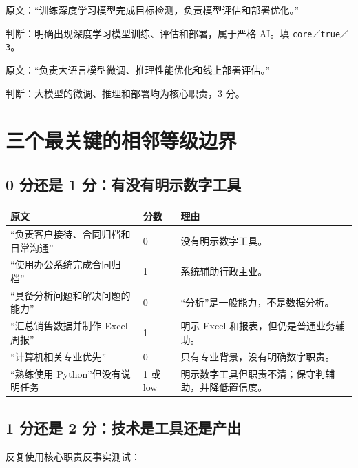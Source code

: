 \documentclass[11pt,a4paper,fontset=none]{ctexart}
\begin{document}
\begin{examplebox}[3 分例 1：计算机视觉]
原文：“训练深度学习模型完成目标检测，负责模型评估和部署优化。”

判断：明确出现深度学习模型训练、评估和部署，属于严格 AI。填 \texttt{core／true／3}。
\end{examplebox}

\begin{examplebox}[3 分例 2：大语言模型]
原文：“负责大语言模型微调、推理性能优化和线上部署评估。”

判断：大模型的微调、推理和部署均为核心职责，3 分。
\end{examplebox}

\section{三个最关键的相邻等级边界}

\subsection{0 分还是 1 分：有没有明示数字工具}

\noindent\begin{tabularx}{\textwidth}{Y C{1.4cm} Y}
\toprule
\textbf{原文} & \textbf{分数} & \textbf{理由}\\
\midrule
“负责客户接待、合同归档和日常沟通” & 0 & 没有明示数字工具。\\
“使用办公系统完成合同归档” & 1 & 系统辅助行政主业。\\
“具备分析问题和解决问题的能力” & 0 & “分析”是一般能力，不是数据分析。\\
“汇总销售数据并制作 Excel 周报” & 1 & 明示 Excel 和报表，但仍是普通业务辅助。\\
“计算机相关专业优先” & 0 & 只有专业背景，没有明确数字职责。\\
“熟练使用 Python”但没有说明任务 & 1 或 low & 明示数字工具但职责不清；保守判辅助，并降低置信度。\\
\bottomrule
\end{tabularx}

\subsection{1 分还是 2 分：技术是工具还是产出}

反复使用核心职责反事实测试：
\end{document}

